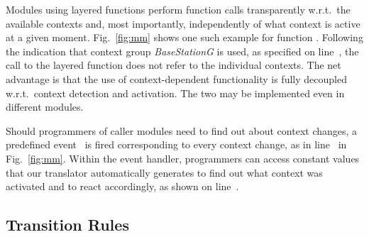 
Modules using layered functions perform function calls transparently
w.r.t.\ the available contexts and, most importantly, independently of
what context is active at a given moment. Fig.~\ref{fig:mm} shows one
such example for function . Following the indication that
context group \emph{BaseStationG} is used, as specified on
line~, the call to the layered function 
does not refer to the individual contexts. The net advantage is that
the use of context-dependent functionality is fully decoupled w.r.t.\
context detection and activation. The two may be implemented even in
different modules.


Should programmers of caller modules need to find out
about context changes, a predefined event~ is
fired corresponding to every context change, as in
line~ in Fig.~\ref{fig:mm}. %
Within the event handler, programmers can access constant values that
our translator automatically generates to find out what context was
activated and to react accordingly, as shown on
line~.




\subsection{Transition Rules}\label{subsec:rules}

